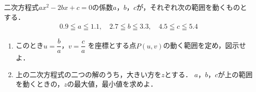 \documentclass[../../main.tex]{subfiles}
\begin{document}
二次方程式$ax^2-2bx+c=0$の係数$a$，$b$，$c$が，それぞれ次の範囲を動くものとする．
\begin{align*}
  0.9 \leqq a \leqq 1.1,
  \quad
  2.7 \leqq b \leqq 3.3,
  \quad
  4.5 \leqq c \leqq 5.4
\end{align*}
\begin{enumerate}
  \item このとき$\displaystyle u=\dfrac{b}{a}$，$\displaystyle v=\dfrac{c}{a}$
    を座標とする点$P(u,v)$の動く範囲を定め，図示せよ．
  \item 上の二次方程式の二つの解のうち，大きい方を$z$とする．
    $a$，$b$，$c$が上の範囲を動くときの，$z$の最大値，最小値を求めよ．
\end{enumerate}
\end{document}
